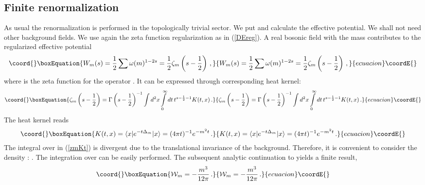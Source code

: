 \documentclass[a4paper,12pt]{article}
\begin{document}
\subsection{Finite renormalization}
As usual the renormalization is performed in the topologically
trivial sector. We put \coordHE{} and calculate the effective
potential. We shall not need other background fields. We use again
the zeta function regularization as in (\ref{DEreg}). A real
bosonic field with the mass \coordHE{} contributes to the regularized
effective potential
\begin{equation}\coord{}\boxEquation{
W_m(s)=\frac 12 \sum \omega (m)^{1-2s} = \frac 12 \zeta_m \left(
s-\frac 12\right) \,, \label{mW}
}{
W_m(s)=\frac 12 \sum \omega (m)^{1-2s} = \frac 12 \zeta_m \left(
s-\frac 12\right) \,, }{ecuacion}\coordE{}\end{equation}
where \coordHE{} is the zeta function for the operator
\coordHE{}. It can be expressed through
corresponding heat kernel:
\begin{equation}\coord{}\boxEquation{
\zeta_m \left( s-\frac 12\right)= \Gamma \left( s-\frac
12\right)^{-1} \int d^2x \int\limits_0^\infty dt\, t^{s-\frac 12
-1} K(t,x) \,.\label{zmKt}
}{
\zeta_m \left( s-\frac 12\right)= \Gamma \left( s-\frac
12\right)^{-1} \int d^2x \int\limits_0^\infty dt\, t^{s-\frac 12
-1} K(t,x) \,.}{ecuacion}\coordE{}\end{equation}
The heat kernel reads
\begin{equation}\coord{}\boxEquation{
K(t,x)=\langle x | e^{-t\Delta_m } | x\rangle = (4\pi t)^{-1}
e^{-m^2t} \,.\label{Ktx}
}{
K(t,x)=\langle x | e^{-t\Delta_m } | x\rangle = (4\pi t)^{-1}
e^{-m^2t} \,.}{ecuacion}\coordE{}\end{equation}
The integral over \coordHE{} in (\ref{zmKt}) is divergent due to the
translational invariance of the background. Therefore, it is
convenient to consider the density \coordHE{}: \coordHE{}. The integration over \coordHE{} can be easily performed. The
subsequent analytic continuation to \coordHE{} yields a finite result,
\begin{equation}\coord{}\boxEquation{
{\cal W}_m =-\frac {m^3}{12\pi} \,.\label{cWm}
}{
{\cal W}_m =-\frac {m^3}{12\pi} \,.}{ecuacion}\coordE{}\end{equation}
\end{document}
